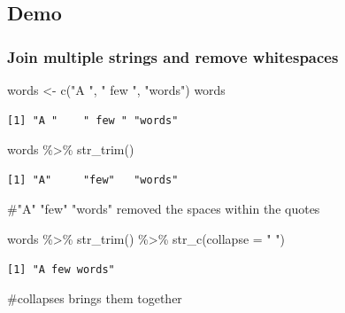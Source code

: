 \documentclass[
  letterpaper,
  DIV=11,
  numbers=noendperiod]{scrartcl}
\newenvironment{Shaded}{\begin{snugshade}}{\end{snugshade}}
\newcommand{\AttributeTok}[1]{\textcolor[rgb]{0.40,0.45,0.13}{#1}}
\newcommand{\CommentTok}[1]{\textcolor[rgb]{0.37,0.37,0.37}{#1}}
\newcommand{\FunctionTok}[1]{\textcolor[rgb]{0.28,0.35,0.67}{#1}}
\newcommand{\NormalTok}[1]{\textcolor[rgb]{0.00,0.23,0.31}{#1}}
\newcommand{\OtherTok}[1]{\textcolor[rgb]{0.00,0.23,0.31}{#1}}
\newcommand{\SpecialCharTok}[1]{\textcolor[rgb]{0.37,0.37,0.37}{#1}}
\newcommand{\StringTok}[1]{\textcolor[rgb]{0.13,0.47,0.30}{#1}}
\begin{document}
\subsection{Demo}\label{demo-14}

\subsubsection{Join multiple strings and remove
whitespaces}\label{join-multiple-strings-and-remove-whitespaces}

\begin{Shaded}
\begin{Highlighting}[]
\NormalTok{words }\OtherTok{\textless{}{-}} \FunctionTok{c}\NormalTok{(}\StringTok{"A "}\NormalTok{, }\StringTok{" few "}\NormalTok{, }\StringTok{"words"}\NormalTok{)}
\NormalTok{words}
\end{Highlighting}
\end{Shaded}

\begin{verbatim}
[1] "A "    " few " "words"
\end{verbatim}

\begin{Shaded}
\begin{Highlighting}[]
\NormalTok{words }\SpecialCharTok{\%\textgreater{}\%}
    \FunctionTok{str\_trim}\NormalTok{()}
\end{Highlighting}
\end{Shaded}

\begin{verbatim}
[1] "A"     "few"   "words"
\end{verbatim}

\begin{Shaded}
\begin{Highlighting}[]
\CommentTok{\#"A"     "few"   "words" removed the spaces within the quotes}
\end{Highlighting}
\end{Shaded}

\begin{Shaded}
\begin{Highlighting}[]
\NormalTok{words }\SpecialCharTok{\%\textgreater{}\%}
    \FunctionTok{str\_trim}\NormalTok{() }\SpecialCharTok{\%\textgreater{}\%}
    \FunctionTok{str\_c}\NormalTok{(}\AttributeTok{collapse =} \StringTok{" "}\NormalTok{)}
\end{Highlighting}
\end{Shaded}

\begin{verbatim}
[1] "A few words"
\end{verbatim}

\begin{Shaded}
\begin{Highlighting}[]
\CommentTok{\#collapses brings them together}
\end{Highlighting}
\end{Shaded}
\end{document}
